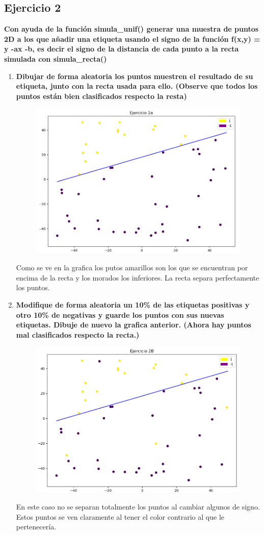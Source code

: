 \documentclass[titlepage]{article}
\begin{document}
	\subsection{Ejercicio 2}
	\textbf{Con ayuda de la función simula\_unif() generar una muestra de puntos 2D a los que añadir una etiqueta usando el signo de la función f(x,y) = y -ax -b, es decir el signo de la distancia de cada punto a la recta simulada con simula\_recta()}
	
	\begin{enumerate}
		\item 
		\textbf{Dibujar de forma aleatoria los puntos muestren el resultado de su etiqueta, junto con la recta usada para ello. (Observe que todos los puntos están bien clasificados respecto la resta)}
		
		\begin{figure}[H]
			\centering
			\includegraphics[width=0.7\linewidth]{screenshot003}
			\caption{}
			\label{fig:screenshot003}
		\end{figure}
		
		Como se ve en la grafica los putos amarillos son los que se encuentran por encima de la recta y los morados los inferiores. La recta separa perfectamente los puntos.
		
		\item 
		\textbf{Modifique de forma aleatoria un 10\% de las etiquetas positivas y otro 10\% de negativas y guarde los puntos con sus nuevas etiquetas. Dibuje de nuevo la grafica anterior. (Ahora hay puntos mal clasificados respecto la recta.)}
		
		\begin{figure}[H]
			\centering
			\includegraphics[width=0.7\linewidth]{screenshot004}
			\caption{}
			\label{fig:screenshot004}	 
		\end{figure}
		En este caso no se separan totalmente los puntos al cambiar algunos de signo. Estos puntos se ven claramente al tener el color contrario al que le pertenecería.
		

\end{enumerate}
\end{document}
